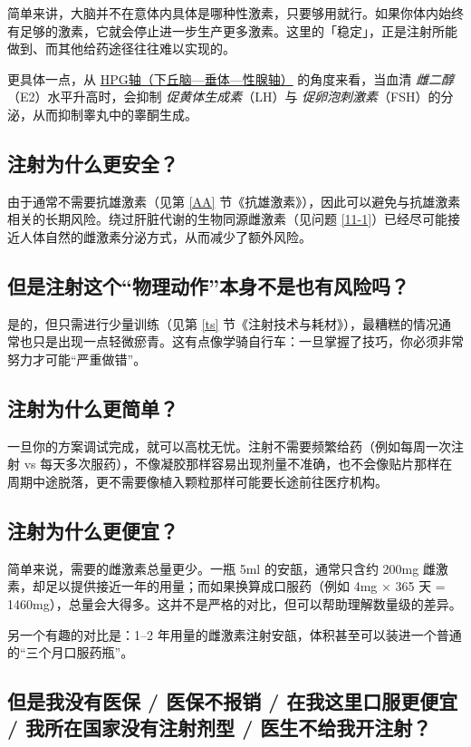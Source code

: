 \documentclass{article}
\begin{document}
简单来讲，大脑并不在意体内具体是哪种性激素，只要够用就行。如果你体内始终有足够的激素，它就会停止进一步生产更多激素。这里的「稳定」，正是注射所能做到、而其他给药途径往往难以实现的。

更具体一点，从 \href{https://en.wikipedia.org/wiki/Hypothalamic-pituitary-gonadal_axis}{HPG轴（下丘脑—垂体—性腺轴）} 的角度来看，当血清 \textit{雌二醇}（E2）水平升高时，会抑制 \textit{促黄体生成素}（LH）与 \textit{促卵泡刺激素}（FSH）的分泌，从而抑制睾丸中的睾酮生成。

\subsection{注射为什么更安全？}

由于通常不需要抗雄激素（见第 \ref{AA} 节《抗雄激素》），因此可以避免与抗雄激素相关的长期风险。绕过肝脏代谢的生物同源雌激素（见问题 \ref{11-1}）已经尽可能接近人体自然的雌激素分泌方式，从而减少了额外风险。

\subsection{但是注射这个“物理动作”本身不是也有风险吗？}

是的，但只需进行少量训练（见第 \ref{ts} 节《注射技术与耗材》），最糟糕的情况通常也只是出现一点轻微瘀青。这有点像学骑自行车：一旦掌握了技巧，你必须非常努力才可能“严重做错”。

\subsection{注射为什么更简单？}

一旦你的方案调试完成，就可以高枕无忧。注射不需要频繁给药（例如每周一次注射 vs 每天多次服药），不像凝胶那样容易出现剂量不准确，也不会像贴片那样在周期中途脱落，更不需要像植入颗粒那样可能要长途前往医疗机构。

\subsection{注射为什么更便宜？}

简单来说，需要的雌激素总量更少。一瓶 5ml 的安瓿，通常只含约 200mg 雌激素，却足以提供接近一年的用量；而如果换算成口服药（例如 4mg × 365 天 = 1460mg），总量会大得多。这并不是严格的对比，但可以帮助理解数量级的差异。

另一个有趣的对比是：1–2 年用量的雌激素注射安瓿，体积甚至可以装进一个普通的“三个月口服药瓶”。

\subsection{但是我没有医保 / 医保不报销 / 在我这里口服更便宜 / 我所在国家没有注射剂型 / 医生不给我开注射？}
\end{document}
